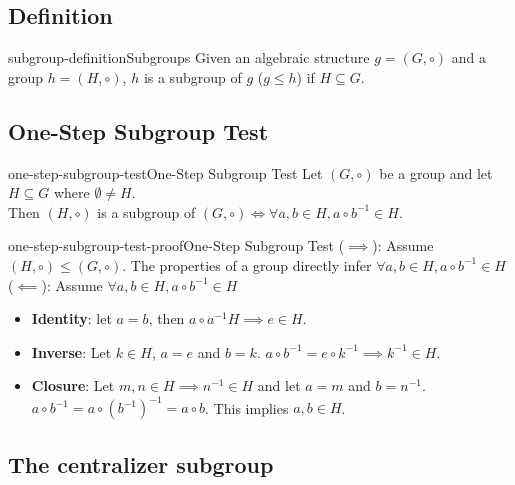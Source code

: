 \documentclass[preview]{standalone}
\begin{document}
\subsection{Definition}

\begin{snippetdefinition}{subgroup-definition}{Subgroups}
    Given an algebraic structure \(g=(G, \circ)\) and a group \(h=(H, \circ)\), \(h\)
    is a subgroup of \(g\) (\(g \leq h\)) if \(H \subseteq G\).
\end{snippetdefinition}

\subsection{One-Step Subgroup Test}

\begin{snippettheorem}{one-step-subgroup-test}{One-Step Subgroup Test}
    Let \((G, \circ)\) be a group and let \(H \subseteq G\) where \(\emptyset \neq H\).\\
    Then \((H, \circ)\) is a subgroup of \((G, \circ) \iff
    \forall a,b \in H, a \circ b^{-1} \in H\).
\end{snippettheorem}

\begin{snippetproof}{one-step-subgroup-test-proof}{One-Step Subgroup Test}
    (\(\implies\)): Assume \((H, \circ) \leq (G, \circ)\).
    The properties of a group directly infer \(\forall a,b \in H, a \circ b^{-1} \in H\) \\
    (\(\impliedby\)): Assume \(\forall a,b \in H, a \circ b^{-1} \in H\)
    \begin{itemize}
        \item \textbf{Identity}: let \(a=b\), then \(a\circ a^{-1} H \implies e \in H\).
        \item \textbf{Inverse}: Let \(k\in H\), \(a=e\) and \(b=k\).
        \(a\circ b^{-1} = e \circ k^{-1} \implies k^{-1} \in H\).
        \item \textbf{Closure}: Let \(m, n \in H \implies n^{-1} \in H\) and let \(a=m\) and \(b=n^{-1}\).
        \(a\circ b^{-1} = a \circ (b^{-1})^{-1}=a\circ b\). This implies \(a, b \in H\).
    \end{itemize}
\end{snippetproof}

\subsection{The centralizer subgroup}
\end{document}
